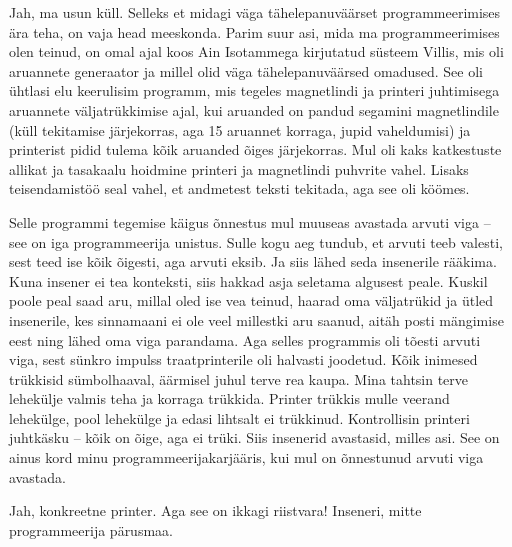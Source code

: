 
Jah, ma usun küll. Selleks et midagi väga tähelepanuväärset programmeerimises ära teha, on vaja
head meeskonda. Parim suur asi, mida ma
programmeerimises olen teinud, on omal ajal koos Ain Isotammega kirjutatud süsteem Villis, mis oli aruannete
generaator ja millel olid väga tähelepanuväärsed omadused. See oli ühtlasi elu
keerulisim programm, mis tegeles magnetlindi ja printeri juhtimisega
aruannete väljatrükkimise ajal, kui aruanded on pandud segamini magnetlindile (küll tekitamise järjekorras, aga 15 aruannet korraga, jupid vaheldumisi)
ja printerist pidid tulema kõik aruanded õiges järjekorras. Mul oli kaks
katkestuste allikat ja tasakaalu hoidmine printeri ja magnetlindi
puhvrite vahel. Lisaks teisendamistöö seal vahel, et andmetest teksti
tekitada, aga see oli köömes.

Selle programmi tegemise käigus õnnestus mul
muuseas avastada arvuti viga -- see on iga programmeerija unistus. Sulle kogu
aeg tundub, et arvuti teeb valesti, sest teed ise kõik õigesti,
aga arvuti eksib. Ja siis lähed seda insenerile rääkima. Kuna
insener ei tea konteksti, siis hakkad asja seletama
algusest peale. Kuskil poole peal saad aru, millal oled ise vea teinud, haarad oma väljatrükid ja
ütled insenerile, kes sinnamaani ei ole veel millestki aru saanud, aitäh
posti mängimise eest ning lähed oma viga parandama. Aga selles programmis oli tõesti
arvuti viga, sest sünkro impulss traatprinterile oli
halvasti joodetud. Kõik inimesed trükkisid sümbolhaaval, äärmisel
juhul terve rea kaupa. Mina tahtsin terve lehekülje valmis teha ja
korraga trükkida. Printer trükkis mulle veerand lehekülge, pool
lehekülge ja edasi lihtsalt ei trükkinud. Kontrollisin printeri juhtkäsku --
kõik on õige, aga ei trüki. Siis insenerid avastasid,
milles asi. See on ainus kord minu programmeerijakarjääris, kui mul on õnnestunud
arvuti viga avastada.


Jah, konkreetne printer. Aga see on ikkagi riistvara! Inseneri, mitte programmeerija pärusmaa.


